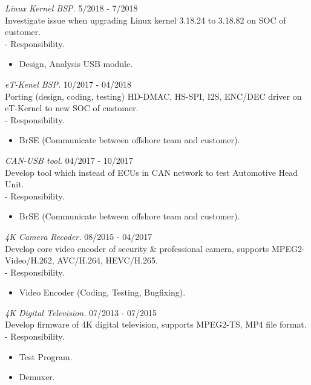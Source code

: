 \documentclass[margin]{res}
\begin{document}
\begin{resume}
                {\sl Linux Kernel BSP.} \hfill            5/2018 - 7/2018 \\
		 Investigate issue when upgrading Linux kernel 3.18.24 to 3.18.82 on SOC of customer.\\
		 - Responsibility.
                 \begin{itemize}  \itemsep -2pt %
                 \item Design, Analysis USB module.
                 \end{itemize}

                {\sl eT-Kenel BSP.} \hfill            10/2017 - 04/2018 \\
		 Porting (design, coding, testing) HD-DMAC, HS-SPI, I2S, ENC/DEC driver on eT-Kernel to new SOC of customer.\\
		 - Responsibility.
                 \begin{itemize}  \itemsep -2pt %
                 \item BrSE (Communicate between offshore team and customer).
                 \end{itemize}

                {\sl CAN-USB tool.} \hfill            04/2017 - 10/2017 \\
		 Develop tool which instead of ECUs in CAN network to test Automotive Head Unit.\\
		 - Responsibility.
                 \begin{itemize}  \itemsep -2pt %
                 \item BrSE (Communicate between offshore team and customer).
                 \end{itemize}

                {\sl 4K Camera Recoder.} \hfill            08/2015 - 04/2017 \\
		 Develop core video encoder of security \& professional camera, supports MPEG2-Video/H.262, AVC/H.264, HEVC/H.265.\\
		 - Responsibility.
                 \begin{itemize}  \itemsep -2pt %
                 \item Video Encoder (Coding, Testing, Bugfixing).
                 \end{itemize}

                {\sl 4K Digital Television.} \hfill            07/2013 - 07/2015 \\
		 Develop firmware of 4K digital television, supports MPEG2-TS, MP4 file format.\\
		 - Responsibility.
                 \begin{itemize}  \itemsep -2pt %
                 \item Test Program.
                 \item Demuxer.
                 \end{itemize}


\end{resume}
\end{document}
